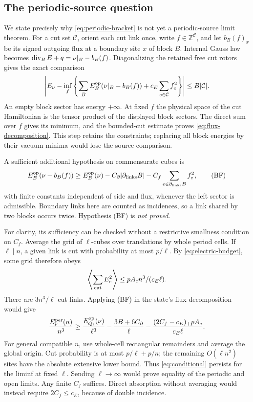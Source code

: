 \subsection{The periodic-source question}

We state precisely why \eqref{eq:periodic-bracket} is not yet
a periodic-source limit theorem. For a cut set $\mathcal C$,
orient each cut link once, write $f\in\mathbb Z^{\mathcal C}$,
and let $b_B(f)_x$ be its signed outgoing flux at a boundary
site $x$ of block $B$. Internal Gauss law becomes
$\operatorname{div}_BE+q=\nu|_B-b_B(f)$.
Diagonalizing the retained free cut rotors gives the exact comparison
\begin{equation}
 \left|E_\nu-\inf_f
 \left\{\sum_B E_B^{\rm op}(\nu|_B-b_B(f))
                           +c_E\sum_{e\in\mathcal C}f_e^2\right\}\right|
 \le B|\mathcal C|.
 \label{eq:flux-decomposition}
\end{equation}
An empty block sector has energy $+\infty$.
At fixed $f$ the physical space of the cut Hamiltonian is the
tensor product of the displayed block sectors. The direct sum
over $f$ gives its minimum, and the bounded-cut estimate proves
\eqref{eq:flux-decomposition}. This step retains the constraints;
replacing all block energies by their vacuum minima would lose
the source comparison.

A sufficient additional hypothesis on commensurate cubes is
\begin{equation}
 E_B^{\rm op}(\nu-b_B(f))\ge E_B^{\rm op}(\nu)
      -C_\partial|\partial_{\rm links}B|
      -C_f\sum_{e\in\partial_{\rm links}B}f_e^2,
 \tag{BF}\label{eq:bf}
\end{equation}
with finite constants independent of side and flux, whenever
the left sector is admissible. Boundary links here are counted
as incidences, so a link shared by two blocks occurs twice.
Hypothesis (BF) is \emph{not proved}.

For clarity, its sufficiency can be checked without a restrictive
smallness condition on $C_f$. Average the grid of $\ell$-cubes
over translations by whole period cells. If $\ell\mid n$, a
given link is cut with probability at most $p/\ell$.
By \eqref{eq:electric-budget}, some grid therefore obeys
\[
 \left\langle\sum_{\rm cut}E_e^2\right\rangle
       \le pA_cn^3/(c_E\ell).
\]
There are $3n^3/\ell$ cut links. Applying (BF) in the state's
flux decomposition would give
\begin{equation}
 \frac{E_\nu^{\rm per}(n)}{n^3}\ge
 \frac{E_{Q_\ell}^{\rm op}(\nu)}{\ell^3}
 -\frac{3B+6C_\partial}{\ell}
 -\frac{(2C_f-c_E)_+pA_c}{c_E\ell}.
 \label{eq:conditional}
\end{equation}
For general compatible $n$, use whole-cell rectangular
remainders and average the global origin. Cut probability is
at most $p/\ell+p/n$; the remaining $O(\ell n^2)$ sites have
the absolute extensive lower bound. Thus \eqref{eq:conditional}
persists for the liminf at fixed $\ell$. Sending $\ell\to\infty$
would prove equality of the periodic and open limits.
Any finite $C_f$ suffices. Direct absorption without averaging
would instead require $2C_f\le c_E$, because of double incidence.

